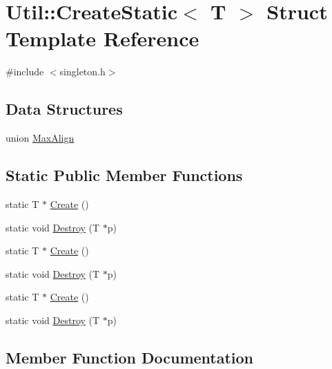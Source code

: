 \hypertarget{structUtil_1_1CreateStatic}{}\section{Util\+:\+:Create\+Static$<$ T $>$ Struct Template Reference}
\label{structUtil_1_1CreateStatic}


{\ttfamily \#include $<$singleton.\+h$>$}

\subsection*{Data Structures}
\begin{DoxyCompactItemize}
\item 
union \mbox{\hyperlink{unionUtil_1_1CreateStatic_1_1MaxAlign}{Max\+Align}}
\end{DoxyCompactItemize}
\subsection*{Static Public Member Functions}
\begin{DoxyCompactItemize}
\item 
static T $\ast$ \mbox{\hyperlink{structUtil_1_1CreateStatic_ab48b58ee24bd7bb78e5a66753c392e25}{Create}} ()
\item 
static void \mbox{\hyperlink{structUtil_1_1CreateStatic_af2da85deb7e0c886a06e74f3f1ac6fd7}{Destroy}} (T $\ast$p)
\item 
static T $\ast$ \mbox{\hyperlink{structUtil_1_1CreateStatic_ab48b58ee24bd7bb78e5a66753c392e25}{Create}} ()
\item 
static void \mbox{\hyperlink{structUtil_1_1CreateStatic_af2da85deb7e0c886a06e74f3f1ac6fd7}{Destroy}} (T $\ast$p)
\item 
static T $\ast$ \mbox{\hyperlink{structUtil_1_1CreateStatic_ab48b58ee24bd7bb78e5a66753c392e25}{Create}} ()
\item 
static void \mbox{\hyperlink{structUtil_1_1CreateStatic_af2da85deb7e0c886a06e74f3f1ac6fd7}{Destroy}} (T $\ast$p)
\end{DoxyCompactItemize}


\subsection{Member Function Documentation}
\mbox{\label{structUtil_1_1CreateStatic_ab48b58ee24bd7bb78e5a66753c392e25}} 

